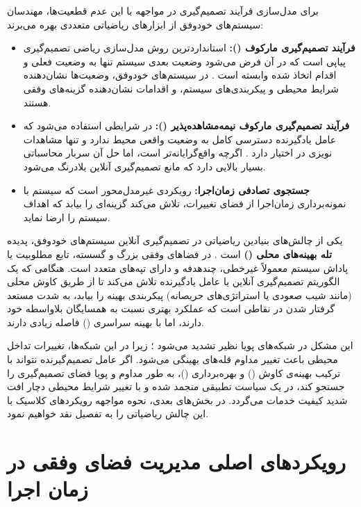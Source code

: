 \documentclass[oneside,openany,phd]{TMU-Thesis}
\begin{document}
برای مدل‌سازی فرآیند تصمیم‌گیری در مواجهه با این عدم قطعیت‌ها، مهندسان سیستم‌های خودوفق از ابزارهای ریاضیاتی متعددی بهره می‌برند:
\begin{itemize}
    \item \textbf{فرآیند تصمیم‌گیری مارکوف ():} استانداردترین روش مدل‌سازی ریاضی تصمیم‌گیری پیاپی است که در آن فرض می‌شود وضعیت بعدی سیستم تنها به وضعیت فعلی و اقدام اتخاذ شده وابسته است \cite{puterman1994markov}. در سیستم‌های خودوفق، وضعیت‌ها نشان‌دهنده شرایط محیطی و پیکربندی‌های سیستم، و اقدامات نشان‌دهنده گزینه‌های وفقی هستند.
    \item \textbf{فرآیند تصمیم‌گیری مارکوف نیمه‌مشاهده‌پذیر ():} در شرایطی استفاده می‌شود که عامل یادگیرنده دسترسی کامل به وضعیت واقعی محیط ندارد و تنها مشاهدات نویزی در اختیار دارد \cite{kaelbling1998planning}. اگرچه  واقع‌گرایانه‌تر است، اما حل آن سربار محاسباتی بسیار بالایی دارد که مانع تصمیم‌گیری آنلاین بلادرنگ می‌شود.
    \item \textbf{جستجوی تصادفی زمان‌اجرا:} رویکردی غیرمدل‌محور است که سیستم با نمونه‌برداری زمان‌اجرا از فضای تغییرات، تلاش می‌کند گزینه‌ای را بیابد که اهداف سیستم را ارضا نماید.
\end{itemize}

یکی از چالش‌های بنیادین ریاضیاتی در تصمیم‌گیری آنلاین سیستم‌های خودوفق، پدیده \textbf{تله بهینه‌های محلی ()} است \cite{du2023scalability}. در فضاهای وفقی بزرگ و گسسته، تابع مطلوبیت یا پاداش سیستم معمولاً غیرخطی، چندهدفه و دارای تپه‌های متعدد است. هنگامی که یک الگوریتم تصمیم‌گیری آنلاین یا عامل یادگیرنده تلاش می‌کند تا از طریق کاوش محلی (مانند شیب صعودی یا استراتژی‌های حریصانه) پیکربندی بهینه را بیابد، به شدت مستعد گرفتار شدن در نقاطی است که عملکرد بهتری نسبت به همسایگان بلاواسطه خود دارند، اما با بهینه سراسری () فاصله زیادی دارند.

این مشکل در شبکه‌های پویا نظیر  تشدید می‌شود \cite{gerostathopoulos2019deltaiot}؛ زیرا در این شبکه‌ها، تغییرات تداخل محیطی باعث تغییر مداوم قله‌های بهینگی می‌شود. اگر عامل تصمیم‌گیرنده نتواند با ترکیب بهینه‌ی کاوش () و بهره‌برداری ()، به طور مداوم و پویا فضای تصمیم‌گیری را جستجو کند، در یک سیاست تطبیقی منجمد شده و با تغییر شرایط محیطی دچار افت شدید کیفیت خدمات می‌گردد. در بخش‌های بعدی، نحوه مواجهه رویکردهای کلاسیک با این چالش ریاضیاتی را به تفصیل نقد خواهیم نمود.

\section{رویکردهای اصلی مدیریت فضای وفقی در زمان اجرا}
\label{sec:ch3_approaches}
\end{document}
